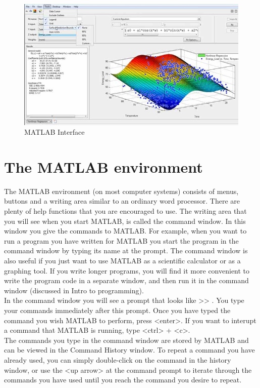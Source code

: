 \documentclass[twoside,a4paper,16pt]{book}
\begin{document}
{{			\begin{figure}[ht!]
				\begin{center}
					\includegraphics[width=13.0cm]{4.jpg}
					\caption{MATLAB Interface}
				\end{center}
			\end{figure}
			\section*{The MATLAB environment} 
			The MATLAB environment (on most computer systems) consists of menus, buttons and a writing area similar to an ordinary word processor. There are plenty of help functions that you are encouraged to use. The writing area that you will see when you start MATLAB, is called the command window. In this window you give the commands to MATLAB. For example, when you want to run a program you have written for MATLAB you start the program in the command window by typing its name at the prompt. The command window is also useful if you just want to use MATLAB as a scientific calculator or as a graphing tool. If you write longer programs, you will find it more convenient to write the program code in a separate window, and then run it in the command window (discussed in Intro to programming).\\
			
			In the command window you will see a prompt that looks like >> . You type your commands immediately after this prompt. Once you have typed the command you wish MATLAB to perform, press <enter>. If you want to interupt a command that MATLAB is running, type <ctrl> + <c>.\\
			
			The commands you type in the command window are stored by MATLAB and can be viewed in the Command History window. To repeat a command you have already used, you can simply double-click on the command in the history window, or use the <up arrow> at the command prompt to iterate through the commands you have used until you reach the command you desire to repeat.\\
}}
\end{document}
